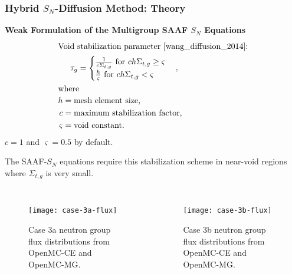 \begin{frame}[noframenumbering]
  \frametitle{Hybrid $S_N$-Diffusion Method: Theory}
  \textbf{Weak Formulation of the Multigroup SAAF $S_N$ Equations}
  \begin{gather}
    \shortintertext{Void stabilization parameter \cite{wang_diffusion_2014}:}
    \tau_g =
    \begin{cases}
      \frac{1}{c\Sigma_{t,g}} \mbox{ for } ch\Sigma_{t,g} \geq \varsigma \\
      \frac{h}{\varsigma} \mbox{ for } ch\Sigma_{t,g} < \varsigma
    \end{cases}, \\
    \shortintertext{where}
    \begin{align*}
      h &= \mbox{mesh element size,} & \\
      c &= \mbox{maximum stabilization factor,} & \\
      \varsigma &= \mbox{void constant.} &
    \end{align*}
  \end{gather}
  $c=1$ and $\varsigma=0.5$ by default.
  \vspace{.2cm}

  The SAAF-$S_N$ equations require this stabilization scheme
  in near-void regions where $\Sigma_{t,g}$ is very small.
\end{frame}

\begin{frame}[noframenumbering]
  \begin{columns}
    \column{5.5cm}
    \begin{figure}[htb!]
      \centering
      \texttt{[image: case-3a-flux]}
      \caption{Case 3a neutron group flux distributions from OpenMC-CE and OpenMC-MG.}
      \label{fig:3a-flux}
    \end{figure}
    \column{5.5cm}
    \begin{figure}[htb!]
      \centering
      \texttt{[image: case-3b-flux]}
      \caption{Case 3b neutron group flux distributions from OpenMC-CE and OpenMC-MG.}
      \label{fig:3b-flux}
    \end{figure}
  \end{columns}
\end{frame}


